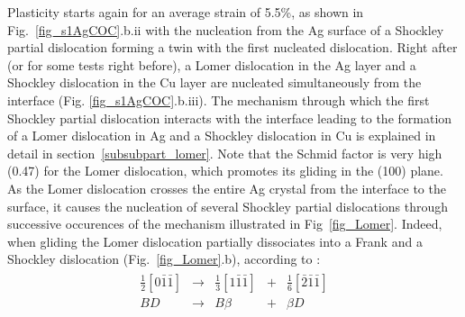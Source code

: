 \documentclass[final,3p,times,twocolumn]{elsarticle}
\begin{document}
Plasticity starts again for an average strain of 5.5\%, as shown in Fig.~\ref{fig_s1AgCOC}.b.ii with the nucleation from the Ag surface of a Shockley partial dislocation forming a twin with the first nucleated dislocation. Right after (or for some tests right before), a Lomer dislocation in the Ag layer and a Shockley dislocation in the Cu layer are nucleated simultaneously from the interface (Fig. \ref{fig_s1AgCOC}.b.iii). The mechanism through which the first Shockley partial dislocation interacts with the interface leading to the formation of a Lomer dislocation in Ag and a Shockley dislocation in Cu is explained in detail in section~\ref{subsubpart_lomer}. 
Note that the Schmid factor is very high (0.47) for the Lomer dislocation, which promotes its gliding in the (100) plane.
As the Lomer dislocation crosses the entire Ag crystal from the interface to the surface, it causes the nucleation of several Shockley partial dislocations through successive occurences of the mechanism illustrated in Fig~\ref{fig_Lomer}. Indeed, when gliding the Lomer dislocation partially dissociates into a Frank and a Shockley dislocation (Fig.~\ref{fig_Lomer}.b), according to \cite{wu09AM}:
\begin{eqnarray}\label{1}
	\begin{array}{ccccc}
\frac{1}{2}\left[0\bar{1}\bar{1}\right] &\rightarrow &  \frac{1}{3}\left[1\bar{1}\bar{1}\right]&+& \frac{1}{6}\left[\bar{2}\bar{1}\bar{1}\right] \\
BD &\rightarrow &  B\beta &+& \beta D\\
	\end{array}
\end{eqnarray} 
\end{document}
